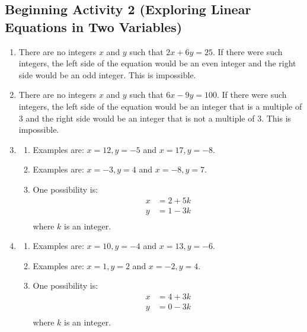 \documentclass[11pt]{article}
\begin{document}
\newpage
\subsection*{Beginning Activity 2 (Exploring Linear Equations in Two Variables)}
\begin{enumerate}
\item There are no integers $x$ and $y$ such that $2x + 6y = 25$.  If there were such integers, the left side of the equation would be an even integer and the right side would be an odd integer.   This is impossible.

\item There are no integers $x$ and $y$ such that $6x - 9y = 100$.  If there were such integers, the left side of the equation would be an integer that is a  multiple of 3 and the right side would be an integer that is not a multiple of 3.   This is impossible.

\item \begin{enumerate}
\item Examples are:  $x = 12,y =  - 5$  and  $x = 17,y =  - 8$.

\item Examples are:  $x =  - 3,y = 4$  and  $x =  - 8,y = 7$.

\item One possibility is:
\[
\begin{aligned}
  x &= 2 + 5k \\ 
  y &= 1 - 3k \\ 
\end{aligned} 
\]
where $k$  is an integer.
\end{enumerate}

\item \begin{enumerate}
\item Examples are:  $x = 10,y =  - 4$  and  $x = 13,y =  - 6$.

\item Examples are:  $x = 1,y = 2$  and  $x =  - 2,y = 4$.

\item One possibility is:  
\[
\begin{aligned}
  x &= 4 + 3k \\ 
  y &= 0 - 3k \\ 
\end{aligned} 
\]
where $k$  is an integer.
\end{enumerate}
\end{enumerate}
\hbreak
\end{document}
